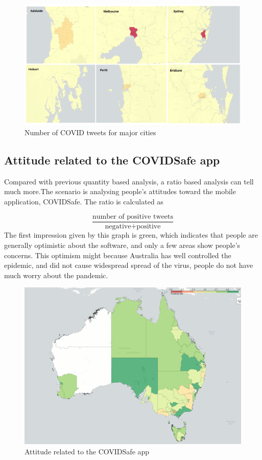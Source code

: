     \begin{figure}[H]
    \centering
    \includegraphics[scale=0.4]{city_analytics/report/images/covid-tweets-each-city.png}
    \caption{Number of COVID tweets for major cities}
    \label{fig:Number of COVID tweets for major cities}
    \end{figure}
    
    \subsection{Attitude related to the COVIDSafe app} 
    Compared with previous quantity based analysis, a ratio based analysis can tell much more.The scenario is analysing people's attitudes toward the mobile application, COVIDSafe. The ratio is calculated as
    
    \[\frac{\text{number of positive tweets}}{\text{negative} + \text{positive}}\]
    The first impression given by this graph is green, which indicates that people are generally optimistic about the software, and only a few areas show people's concerns. This optimism might because Australia has well controlled the epidemic, and did not cause widespread spread of the virus, people do not have much worry about the pandemic.
   
    \begin{figure}[H]
    \centering
    \includegraphics[scale=0.4]{city_analytics/report/images/covidsafe.png}
    \caption{Attitude related to the COVIDSafe app}
    \label{fig:Attitude related to the COVIDSafe app}
    \end{figure}
    
